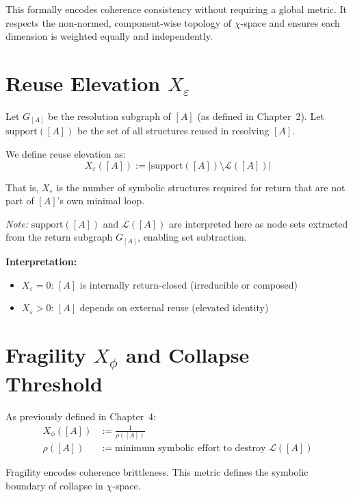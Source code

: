 This formally encodes coherence consistency without requiring a global metric.  
It respects the non-normed, component-wise topology of $\chi$-space and ensures each dimension is weighted equally and independently.

\section{Reuse Elevation $X_\varepsilon$} \label{reuse-elevation-xe}

Let $G_{[A]}$ be the resolution subgraph of $[A]$ (as defined in Chapter~2).  
Let $\text{support}([A])$ be the set of all structures reused in resolving $[A]$.

\begin{definition} \label{def:reuse-elevation}
We define reuse elevation as:
\begin{equation} \label{eq:reuse-elevation}
X_\varepsilon([A]) := \left| \text{support}([A]) \setminus \mathcal{L}([A]) \right|
\end{equation}
\end{definition}

That is, $X_\varepsilon$ is the number of symbolic structures required for return  
that are not part of $[A]$’s own minimal loop.

\textit{Note:} $\text{support}([A])$ and $\mathcal{L}([A])$ are interpreted here as node sets  
extracted from the return subgraph $G_{[A]}$, enabling set subtraction.

\textbf{Interpretation:}
\begin{itemize}
  \item $X_\varepsilon = 0$: $[A]$ is internally return-closed (irreducible or composed)
  \item $X_\varepsilon > 0$: $[A]$ depends on external reuse (elevated identity)
\end{itemize}

\section{Fragility $X_\phi$ and Collapse Threshold}

As previously defined in Chapter~4:
\begin{align*}
X_\phi([A]) &:= \frac{1}{\rho([A])} \\
\rho([A]) &:= \text{minimum symbolic effort to destroy } \mathcal{L}([A])
\end{align*}

Fragility encodes coherence brittleness.  
This metric defines the symbolic boundary of collapse in $\chi$-space.

